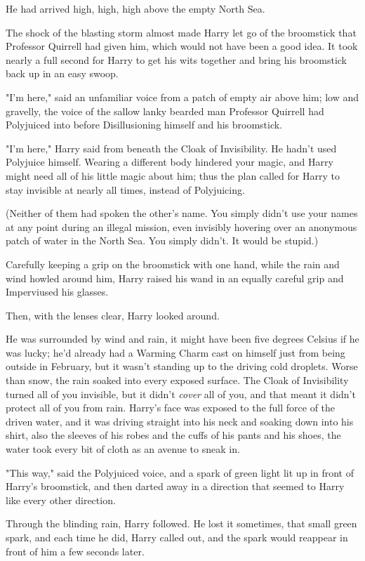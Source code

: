 He had arrived high, high, high above the empty North Sea.

The shock of the blasting storm almost made Harry let go of the broomstick that
Professor Quirrell had given him, which would not have been a good idea. It
took nearly a full second for Harry to get his wits together and bring his
broomstick back up in an easy swoop.

"I'm here," said an unfamiliar voice from a patch of empty air above him; low
and gravelly, the voice of the sallow lanky bearded man Professor Quirrell had
Polyjuiced into before Disillusioning himself and his broomstick.

"I'm here," Harry said from beneath the Cloak of Invisibility. He hadn't used
Polyjuice himself. Wearing a different body hindered your magic, and Harry
might need all of his little magic about him; thus the plan called for Harry to
stay invisible at nearly all times, instead of Polyjuicing.

(Neither of them had spoken the other's name. You simply didn't use your names
at any point during an illegal mission, even invisibly hovering over an
anonymous patch of water in the North Sea. You simply didn't. It would be
stupid.)

Carefully keeping a grip on the broomstick with one hand, while the rain and
wind howled around him, Harry raised his wand in an equally careful grip and
Imperviused his glasses.

Then, with the lenses clear, Harry looked around.

He was surrounded by wind and rain, it might have been five degrees Celsius if
he was lucky; he'd already had a Warming Charm cast on himself just from being
outside in February, but it wasn't standing up to the driving cold droplets.
Worse than snow, the rain soaked into every exposed surface. The Cloak of
Invisibility turned all of you invisible, but it didn't \emph{cover} all of
you, and that meant it didn't protect all of you from rain. Harry's face was
exposed to the full force of the driven water, and it was driving straight into
his neck and soaking down into his shirt, also the sleeves of his robes and the
cuffs of his pants and his shoes, the water took every bit of cloth as an
avenue to sneak in.

"This way," said the Polyjuiced voice, and a spark of green light lit up in
front of Harry's broomstick, and then darted away in a direction that seemed to
Harry like every other direction.

Through the blinding rain, Harry followed. He lost it sometimes, that small
green spark, and each time he did, Harry called out, and the spark would
reappear in front of him a few seconds later.


